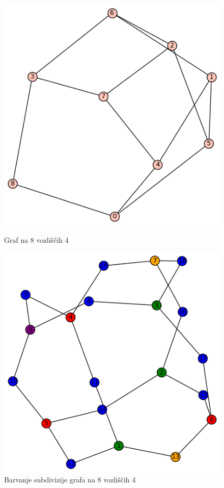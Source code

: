 \documentclass[11pt,a4paper,titlepage]{article}
\begin{document}
\begin{figure}[h]
	\centering
	\begin{minipage}{0.45\textwidth}
		\centering
		\includegraphics[width=\linewidth]{orig_8_4.png}
		\caption{Graf na 8 vozliščih 4}
	\end{minipage}
	\hfill
	\begin{minipage}{0.45\textwidth}
		\centering
		\includegraphics[scale=0.6]{sub_8_4.png}
		\caption{Barvanje subdivizije grafa na 8 vozliščih 4}
	\end{minipage}
\end{figure}
\end{document}
